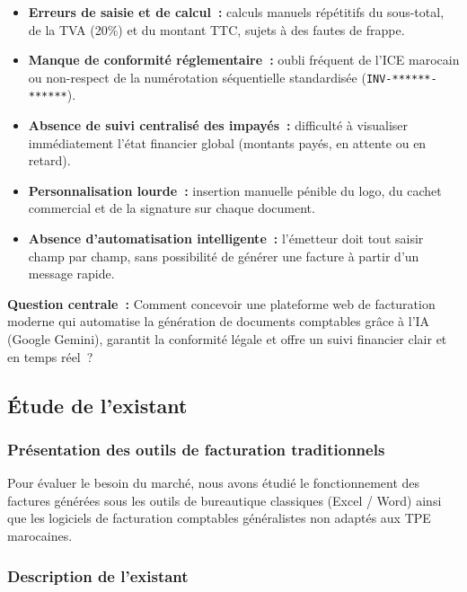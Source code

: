 \documentclass[a4paper,12pt]{extarticle}
\begin{document}
\begin{itemize}
  \item \textbf{Erreurs de saisie et de calcul~:} calculs manuels répétitifs du sous-total, de la TVA (20\%) et du montant TTC, sujets à des fautes de frappe.
  \item \textbf{Manque de conformité réglementaire~:} oubli fréquent de l'ICE marocain ou non-respect de la numérotation séquentielle standardisée (\texttt{INV-******-******}).
  \item \textbf{Absence de suivi centralisé des impayés~:} difficulté à visualiser immédiatement l'état financier global (montants payés, en attente ou en retard).
  \item \textbf{Personnalisation lourde~:} insertion manuelle pénible du logo, du cachet commercial et de la signature sur chaque document.
  \item \textbf{Absence d'automatisation intelligente~:} l'émetteur doit tout saisir champ par champ, sans possibilité de générer une facture à partir d'un message rapide.
\end{itemize}

\begin{notebox}
\textbf{Question centrale~:} Comment concevoir une plateforme web de facturation moderne qui automatise la génération de documents comptables grâce à l'IA (Google Gemini), garantit la conformité légale et offre un suivi financier clair et en temps réel~?
\end{notebox}

\subsection{Étude de l'existant}

\subsubsection{Présentation des outils de facturation traditionnels}

Pour évaluer le besoin du marché, nous avons étudié le fonctionnement des factures générées sous les outils de bureautique classiques (Excel / Word) ainsi que les logiciels de facturation comptables généralistes non adaptés aux TPE marocaines.

\subsubsection{Description de l'existant}
\end{document}
